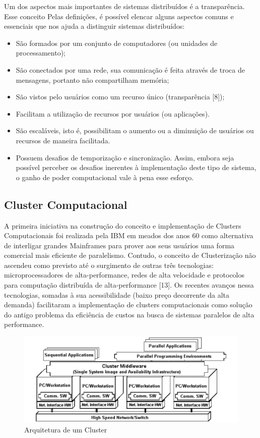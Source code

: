 Um dos aspectos mais importantes de sistemas distribuídos é a transparência. Esse conceito
Pelas definições, é possível elencar alguns aspectos comuns e essenciais que nos ajuda a distinguir sistemas distribuídos: 

\begin{itemize}
    \item São formados por um conjunto de computadores (ou unidades de processamento);
    \item São conectados por uma rede, sua comunicação é feita através de troca de mensagens, portanto não compartilham memória;
    \item São vistos pelo usuários como um recurso único (transparência [8]);
    \item Facilitam a utilização de recursos por usuários (ou aplicações).
    \item São escaláveis, isto é, possibilitam o aumento ou a diminuição de usuários ou recursos de maneira facilitada.
    \item Possuem desafios de temporização e sincronização.
    Assim, embora seja possível perceber os desafios inerentes à implementação deste tipo de sistema, o ganho de poder computacional vale à pena esse esforço.
\end{itemize}

\subsection{Cluster Computacional} \label{cap2sec1subsec1}

A primeira iniciativa na construção do conceito e implementação de Clusters Computacionais foi realizada pela IBM em meados dos anos 60 como alternativa de interligar grandes Mainframes para prover aos seus usuários uma forma comercial mais eficiente de paralelismo. Contudo, o conceito de Clusterização não ascendeu como previsto até o surgimento de outras três tecnologias: microprocessadores de alta-performance, redes de alta velocidade e protocolos para computação distribuída de alta-performance [13]. Os recentes avanços nessa tecnologias, somadas à sua acessibilidade (baixo preço decorrente da alta demanda) facilitaram a implementação de clusters computacionais como solução do antigo problema da eficiência de custos na busca de sistemas paralelos de alta performance.

\begin{figure}[h!]
\centering
\includegraphics[scale=0.61]{images/cluster_architecture.jpg}
\caption{Arquitetura de um Cluster}
\label{fig:cluster_architecture}
\end{figure}

